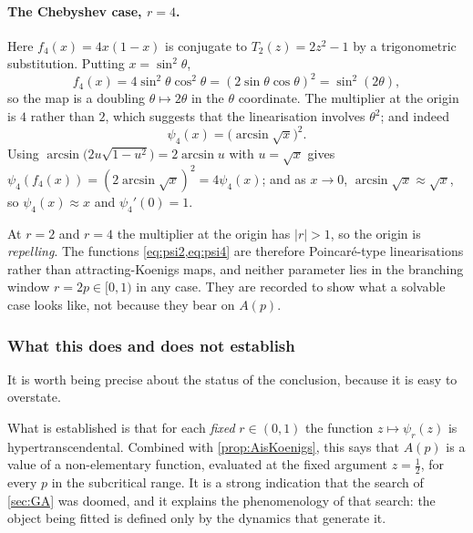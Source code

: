 \paragraph{The Chebyshev case, $r=4$.}
Here $f_4(x) = 4x(1-x)$ is conjugate to $T_2(z) = 2z^2-1$ by a trigonometric
substitution. Putting $x=\sin^2\theta$,
\begin{equation*}
f_4(x) = 4\sin^2\theta\cos^2\theta = (2\sin\theta\cos\theta)^2 = \sin^2(2\theta),
\end{equation*}
so the map is a doubling $\theta\mapsto2\theta$ in the $\theta$ coordinate. The
multiplier at the origin is $4$ rather than $2$, which suggests that the
linearisation involves $\theta^2$; and indeed
\begin{equation}
\label{eq:psi4}
\psi_4(x) = \bigl(\arcsin\sqrt{x}\bigr)^2 .
\end{equation}
Using $\arcsin\bigl(2u\sqrt{1-u^2}\bigr) = 2\arcsin u$ with $u=\sqrt x$ gives
$\psi_4(f_4(x)) = (2\arcsin\sqrt x)^2 = 4\psi_4(x)$; and as $x\to0$,
$\arcsin\sqrt x\approx\sqrt x$, so $\psi_4(x)\approx x$ and $\psi_4'(0)=1$.

\begin{remark}
\label{rem:attractrepel}
At $r=2$ and $r=4$ the multiplier at the origin has $|r|>1$, so the origin is
\emph{repelling}. The functions \cref{eq:psi2,eq:psi4} are therefore
Poincaré-type linearisations rather than attracting-Koenigs maps, and neither
parameter lies in the branching window $r=2p\in[0,1)$ in any case. They are
recorded to show what a solvable case looks like, not because they bear on $A(p)$.
\end{remark}

\subsubsection*{What this does and does not establish}

It is worth being precise about the status of the conclusion, because it is easy to
overstate.

What is established is that for each \emph{fixed} $r\in(0,1)$ the function
$z\mapsto\psi_r(z)$ is hypertranscendental. Combined with \cref{prop:AisKoenigs},
this says that $A(p)$ is a value of a non-elementary function, evaluated at the
fixed argument $z=\tfrac12$, for every $p$ in the subcritical range. It is a strong
indication that the search of \cref{sec:GA} was doomed, and it explains the
phenomenology of that search: the object being fitted is defined only by the
dynamics that generate it.


